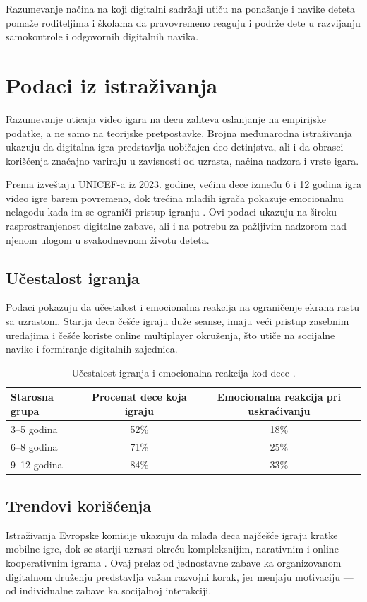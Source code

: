 \documentclass[a4paper,12pt]{article}
\begin{document}
\bigskip

Razumevanje načina na koji digitalni sadržaji utiču na ponašanje i navike deteta pomaže roditeljima i školama da pravovremeno reaguju i podrže dete u razvijanju samokontrole i odgovornih digitalnih navika.


\section{Podaci iz istraživanja}

Razumevanje uticaja video igara na decu zahteva oslanjanje na empirijske podatke, a ne samo na teorijske pretpostavke. 
Brojna međunarodna istraživanja ukazuju da digitalna igra predstavlja uobičajen deo detinjstva, ali i da obrasci korišćenja značajno variraju u zavisnosti od uzrasta, načina nadzora i vrste igara.

Prema izveštaju UNICEF-a iz 2023. godine, većina dece između 6 i 12 godina igra video igre barem povremeno, dok trećina mladih igrača pokazuje emocionalnu nelagodu kada im se ograniči pristup igranju \cite{unicef2023gaming}. 
Ovi podaci ukazuju na široku rasprostranjenost digitalne zabave, ali i na potrebu za pažljivim nadzorom nad njenom ulogom u svakodnevnom životu deteta.

\subsection*{Učestalost igranja}
Podaci pokazuju da učestalost i emocionalna reakcija na ograničenje ekrana rastu sa uzrastom. 
Starija deca češće igraju duže seanse, imaju veći pristup zasebnim uređajima i češće koriste online multiplayer okruženja, što utiče na socijalne navike i formiranje digitalnih zajednica.

\begin{table}[H]
\centering
\begin{tabular}{lcc}
\toprule
Starosna grupa & Procenat dece koja igraju & Emocionalna reakcija pri uskraćivanju \\
\midrule
3--5 godina & 52\% & 18\% \\
6--8 godina & 71\% & 25\% \\
9--12 godina & 84\% & 33\% \\
\bottomrule
\end{tabular}
\caption{Učestalost igranja i emocionalna reakcija kod dece \cite{unicef2023gaming}.}
\end{table}

\subsection*{Trendovi korišćenja}
Istraživanja Evropske komisije ukazuju da mlađa deca najčešće igraju kratke mobilne igre, dok se stariji uzrasti okreću kompleksnijim, narativnim i online kooperativnim igrama \cite{eu_kids_online_2023}. 
Ovaj prelaz od jednostavne zabave ka organizovanom digitalnom druženju predstavlja važan razvojni korak, jer menjaju motivaciju — od individualne zabave ka socijalnoj interakciji.
\end{document}
